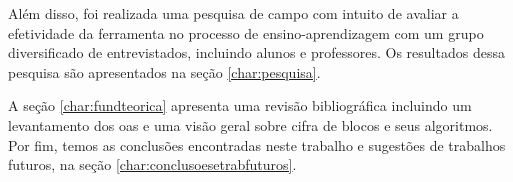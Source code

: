 Além disso, foi realizada uma pesquisa de campo com intuito de avaliar a efetividade da ferramenta no processo de ensino-aprendizagem com um grupo diversificado de entrevistados, incluindo alunos e professores. Os resultados dessa pesquisa são apresentados na seção \ref{char:pesquisa}.

A seção \ref{char:fundteorica} apresenta uma revisão bibliográfica incluindo um levantamento dos \acrshort{oas} e uma visão geral sobre cifra de blocos e seus algoritmos. Por fim, temos as conclusões encontradas neste trabalho e sugestões de trabalhos futuros, na seção \ref{char:conclusoesetrabfuturos}.

